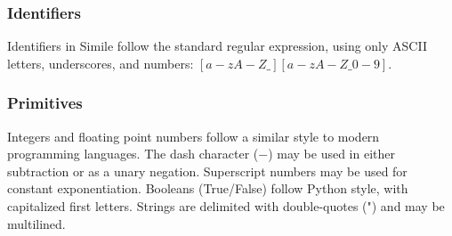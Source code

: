 \documentclass{article}
\begin{document}
\subsubsection{Identifiers}
Identifiers in Simile follow the standard regular expression, using only ASCII letters, underscores, and numbers: $[a-zA-Z\_][a-zA-Z\_0-9]$.

\subsubsection{Primitives}
Integers and floating point numbers follow a similar style to modern programming languages. The dash character ($-$) may be used in either subtraction or as a unary negation. Superscript numbers may be used for constant exponentiation. Booleans (True/False) follow Python style, with capitalized first letters. Strings are delimited with double-quotes (") and may be multilined.

\end{document}
